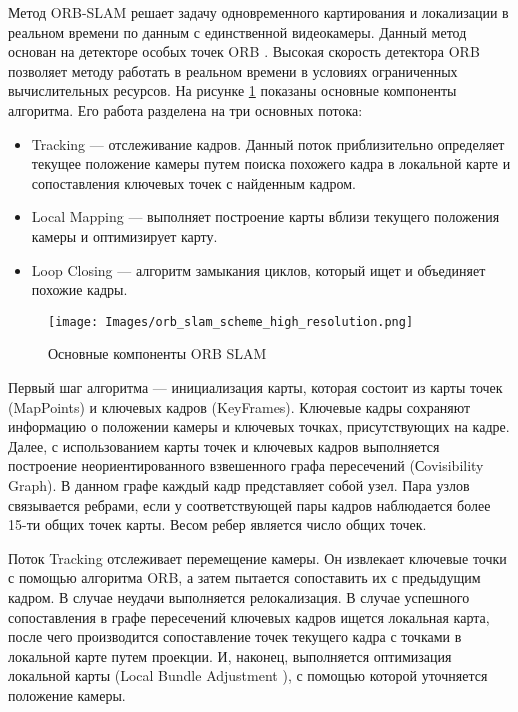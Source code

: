 \documentclass{mipt-thesis-bs}
\begin{document}
Метод ORB-SLAM \cite{mur2015orb} решает задачу одновременного картирования и локализации в реальном времени по данным с единственной видеокамеры. Данный метод основан на детекторе особых точек ORB \cite{rublee2011orb}. Высокая скорость детектора ORB позволяет методу работать в реальном времени в условиях ограниченных вычислительных ресурсов. На рисунке \ref{figureorbslam} показаны основные компоненты алгоритма. Его работа разделена на три основных потока:
\begin{itemize}
	\item Tracking — отслеживание кадров. Данный поток приблизительно определяет текущее положение камеры путем поиска похожего кадра в локальной карте и сопоставления ключевых точек с найденным кадром.
	\item Local Mapping — выполняет построение карты вблизи текущего положения камеры и оптимизирует карту.
	\item Loop Closing — алгоритм замыкания циклов, который ищет и объединяет похожие кадры.
\end{itemize}

\begin{figure}
	\centering
	\texttt{[image: Images/orb\_slam\_scheme\_high\_resolution.png]}
	\caption{Основные компоненты ORB SLAM}
	\label{figureorbslam}
\end{figure}

Первый шаг алгоритма — инициализация карты, которая состоит из карты точек (MapPoints) и ключевых кадров (KeyFrames). Ключевые кадры сохраняют информацию о положении камеры и ключевых точках, присутствующих на кадре. Далее, с использованием карты точек и ключевых кадров выполняется построение неориентированного взвешенного графа пересечений (Сovisibility Graph). В данном графе каждый кадр представляет собой узел. Пара узлов связывается ребрами, если у соответствующей пары кадров наблюдается более 15-ти общих точек карты. Весом ребер является число общих точек.

Поток Tracking отслеживает перемещение камеры. Он извлекает ключевые точки с помощью алгоритма ORB, а затем пытается сопоставить их с предыдущим кадром. В случае неудачи выполняется релокализация. В случае успешного сопоставления в графе пересечений ключевых кадров ищется локальная карта, после чего производится сопоставление точек текущего кадра с точками в локальной карте путем проекции. И, наконец, выполняется оптимизация локальной карты (Local Bundle Adjustment \cite{zhang2006incremental}), с помощью которой уточняется положение камеры.
\end{document}

